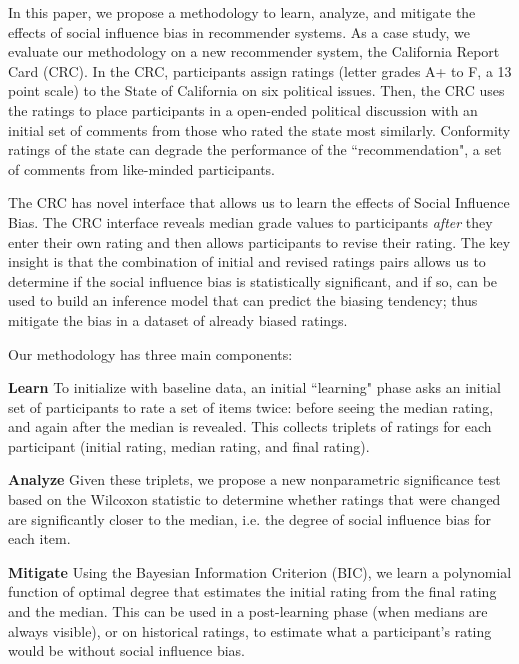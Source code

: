 In this paper, we propose a methodology to learn, analyze, 
and mitigate the effects of social influence bias in recommender systems.  
As a case study, we evaluate our methodology on a new recommender system, the 
California Report Card (CRC).
In the CRC, participants assign ratings (letter grades A+ to F, a 13 point
scale) to the State of California on six political issues.  
Then, the CRC uses the ratings to place participants in a open-ended
political discussion with an initial set of comments from those who 
rated the state most similarly.
Conformity ratings of the state can degrade the performance of the ``recommendation", 
a set of comments from like-minded participants.

The CRC has novel interface that allows us to learn the effects of Social Influence Bias.
The CRC interface reveals median grade values to participants \emph{after} they enter
their own rating and then allows participants to revise their
rating.
The key insight is that the combination of initial and revised ratings
pairs allows us to determine if the social influence bias is
statistically significant, and if so, can be used to build an
inference model that can predict the biasing tendency; thus mitigate the bias 
in a dataset of already biased ratings.  

Our methodology has three main components:
\vspace{1em}

\noindent \textbf{Learn} To initialize with baseline data, an initial
``learning" phase asks an initial set of participants to rate a set of
items twice: before seeing the median rating, and again after the
median is revealed.  This collects triplets of ratings for each
participant (initial rating, median rating, and final rating).

\vspace{1em}

\noindent \textbf{Analyze} Given these triplets, we propose a new
nonparametric significance test based on the Wilcoxon statistic to
determine whether ratings that were changed are significantly closer
to the median, i.e. the degree of social influence bias for each item.

\vspace{1em}

\noindent \textbf{Mitigate} Using the Bayesian Information Criterion
(BIC), we learn a polynomial function of optimal degree that estimates
the initial rating from the final rating and the median. This can be
used in a post-learning phase (when medians are always visible), or on
historical ratings, to estimate what a participant's rating would be
without social influence bias.

